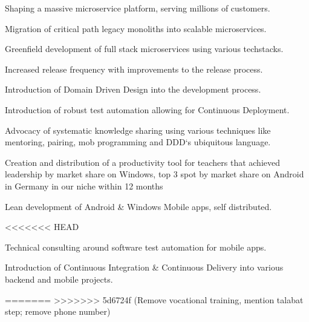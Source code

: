 \documentclass[]{resume}
\begin{document}
\begin{minipage}[t]{0.64\textwidth}
\begin{tightemize}
\begin{tightemize}
\item Shaping a massive microservice platform, serving millions of customers.
\item Migration of critical path legacy monoliths into scalable microservices.
\item Greenfield development of full stack microservices using various techstacks.
\item Increased release frequency with improvements to the release process.
\item Introduction of Domain Driven Design into the development process.
\item Introduction of robust test automation allowing for Continuous Deployment.
\item Advocacy of systematic knowledge sharing using various techniques like mentoring, pairing, mob programming and DDD`s ubiquitous language.
\end{tightemize}
\sectionsep

\begin{tightemize}
\item Creation and distribution of a productivity tool for teachers that achieved leadership by market share on Windows, top 3 spot by market share on Android in Germany in our niche within 12 months
\item Lean development of Android \& Windows Mobile apps, self distributed.
\end{tightemize}
\sectionsep

<<<<<<< HEAD
\begin{tightemize}
\item Technical consulting around software test automation for mobile apps.
\item Introduction of Continuous Integration \& Continuous Delivery into various backend and mobile projects.
\end{tightemize}
=======
>>>>>>> 5d6724f (Remove vocational training, mention talabat step; remove phone number)
\sectionsep




\end{tightemize}
\end{minipage}
\end{document}
